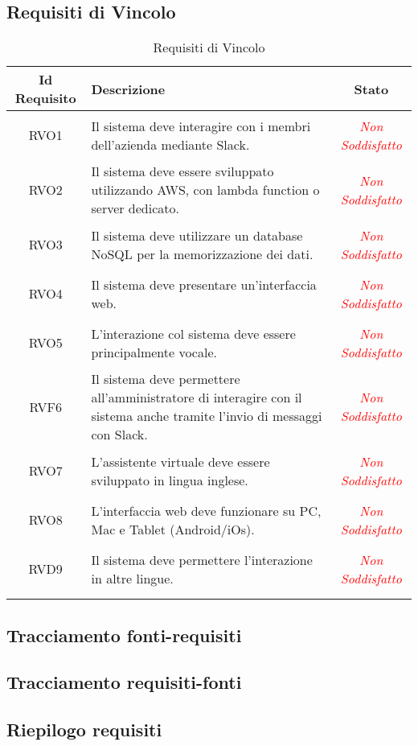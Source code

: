 \subsection{Requisiti di Vincolo}
\normalsize
\begin{longtable}{|c|>{\centering}m{7cm}|c|}
\hline 
\textbf{Id Requisito} & \textbf{Descrizione} & \textbf{Stato}\\
\hline
\endhead
\hypertarget{RVO1}{RVO1} & Il sistema deve interagire con i membri dell'azienda mediante Slack. & \textcolor{red}{\textit{Non Soddisfatto}}\\ \hline

\hypertarget{RVO2}{RVO2} & Il sistema deve essere sviluppato utilizzando AWS, con lambda function o server dedicato. & \textcolor{red}{\textit{Non Soddisfatto}}\\ \hline

\hypertarget{RVO3}{RVO3} & Il sistema deve utilizzare un database NoSQL per la memorizzazione dei dati. & \textcolor{red}{\textit{Non Soddisfatto}}\\ \hline

\hypertarget{RVO4}{RVO4} & Il sistema deve presentare un'interfaccia web. & \textcolor{red}{\textit{Non Soddisfatto}}\\ \hline

\hypertarget{RVO5}{RVO5} & L'interazione col sistema deve essere principalmente vocale. & \textcolor{red}{\textit{Non Soddisfatto}}\\ \hline

\hypertarget{RVF6}{RVF6} & Il sistema deve permettere all'amministratore di interagire con il sistema anche tramite l'invio di messaggi con Slack. & \textcolor{red}{\textit{Non Soddisfatto}}\\ \hline

\hypertarget{RVO7}{RVO7} & L'assistente virtuale deve essere sviluppato in lingua inglese. & \textcolor{red}{\textit{Non Soddisfatto}}\\ \hline

\hypertarget{RVO8}{RVO8} & L'interfaccia web deve funzionare su PC, Mac e Tablet (Android/iOs). & \textcolor{red}{\textit{Non Soddisfatto}}\\ \hline

\hypertarget{RVD9}{RVD9} & Il sistema deve permettere l'interazione in altre lingue. & \textcolor{red}{\textit{Non Soddisfatto}}\\ \hline

\caption[Requisiti di Vincolo]{Requisiti di Vincolo}
\label{tabella:req3}
\end{longtable}
\clearpage

\subsection{Tracciamento fonti-requisiti}
\subsection{Tracciamento requisiti-fonti}
\subsection{Riepilogo requisiti}